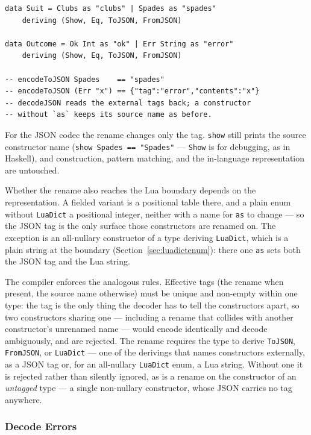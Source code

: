 \documentclass[11pt,a4paper]{article}
\begin{document}
\begin{lstlisting}
data Suit = Clubs as "clubs" | Spades as "spades"
    deriving (Show, Eq, ToJSON, FromJSON)

data Outcome = Ok Int as "ok" | Err String as "error"
    deriving (Show, Eq, ToJSON, FromJSON)

-- encodeToJSON Spades    == "spades"
-- encodeToJSON (Err "x") == {"tag":"error","contents":"x"}
-- decodeJSON reads the external tags back; a constructor
-- without `as` keeps its source name as before.
\end{lstlisting}

For the JSON codec the rename changes only the tag.  \texttt{show}
still prints the source constructor name (\texttt{show Spades ==
"Spades"} --- \texttt{Show} is for debugging, as in Haskell), and
construction, pattern matching, and the in-language representation are
untouched.

Whether the rename also reaches the Lua boundary depends on the
representation.  A fielded variant is a positional table there, and a
plain enum without \texttt{LuaDict} a positional integer, neither with
a name for \texttt{as} to change --- so the JSON tag is the only
surface those constructors are renamed on.  The exception is an
all-nullary constructor of a type deriving \texttt{LuaDict}, which is
a plain string at the boundary (Section~\ref{sec:luadictenum}): there
one \texttt{as} sets both the JSON tag and the Lua string.

The compiler enforces the analogous rules.  Effective tags (the
rename when present, the source name otherwise) must be unique and
non-empty within one type: the tag is the only thing the decoder has
to tell the constructors apart, so two constructors sharing one ---
including a rename that collides with another constructor's unrenamed
name --- would encode identically and decode ambiguously, and are
rejected.  The rename requires the type to derive \texttt{ToJSON},
\texttt{FromJSON}, or \texttt{LuaDict} --- one of the derivings that
names constructors externally, as a JSON tag or, for an all-nullary
\texttt{LuaDict} enum, a Lua string.  Without one it is rejected
rather than silently ignored, as is a rename on the constructor of an
\emph{untagged} type --- a single non-nullary constructor, whose JSON
carries no tag anywhere.

\subsubsection{Decode Errors}
\end{document}
